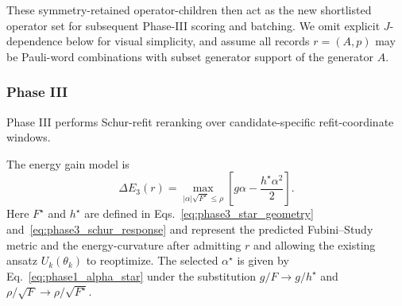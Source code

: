 \documentclass[
  reprint,
  amsmath,
  amssymb,
  aps,
  pra,
  nofootinbib,
  superscriptaddress,
  floatfix
]{revtex4-2}
\begin{document}
These symmetry-retained operator-children then act as the new shortlisted
operator set for subsequent Phase-III scoring and batching. We omit explicit
\(J\)-dependence below for visual simplicity, and assume all records
\(r=(A,p)\) may be Pauli-word combinations with subset generator support of
the generator \(A\).
\subsubsection{Phase III}

Phase III performs Schur-refit reranking over candidate-specific refit-coordinate windows.

The energy gain model is
\begin{equation}
\Delta E_{3}(r)=
\max_{|\alpha|\sqrt{F^\star}\le\rho}
\left[g\alpha-\frac{h^\star \alpha^2}{2}\right].
\label{eq:phase3_gain}
\end{equation}
Here $F^\star$ and $h^\star$ are defined in Eqs.~\eqref{eq:phase3_star_geometry} and~\eqref{eq:phase3_schur_response} and represent the predicted Fubini--Study metric and the energy-curvature after admitting $r$ and allowing the existing ansatz $U_k(\theta_k)$ to reoptimize. The selected $\alpha^\star$ is given by Eq.~\eqref{eq:phase1_alpha_star} under the substitution $g/F \to g/h^\star$ and $\rho / \sqrt{F} \to \rho / \sqrt{F^\star}$.
\end{document}
